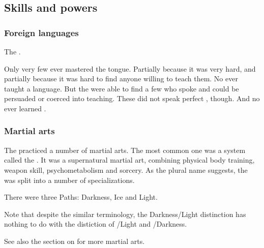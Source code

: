 \subsection{Skills and powers}





\subsubsection{Foreign languages}
The \resphain {}. 

Only very few \resphain ever mastered the \Draconic tongue. 
Partially because it was very hard, and partially because it was hard to find anyone willing to teach them. 
No \dragon ever taught a \resphan language. 
But the \resphain were able to find a few \quiljaaran who spoke \Draconic and could be persuaded or coerced into teaching. 
These \quiljaaran did not speak perfect \Draconic, though. 
And no \resphan ever learned \TrueDraconic. 






\subsubsection{Martial arts}
The \resphain{} practiced a number of martial arts. 
The most common one was a system called the . 
It was a supernatural martial art, combining physical body training, weapon skill, psychometabolism and sorcery. 
As the plural name suggests, the  was split into a number of specializations.

There were three Paths: Darkness, Ice and Light. 

Note that despite the similar terminology, the Darkness/Light distinction has nothing to do with the distiction of \iquin/Light and \itzach/Darkness. 

See also the section on  for more martial arts. 


